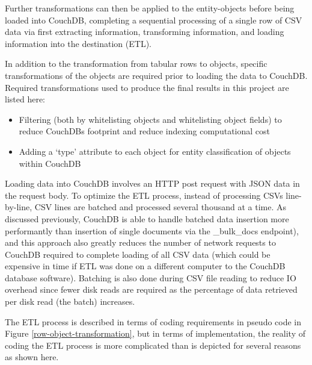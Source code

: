 Further transformations can then be applied to the entity-objects before being loaded into CouchDB, completing a sequential processing of a single row of CSV data via first extracting information, transforming information, and loading information into the destination (ETL).

In addition to the transformation from tabular rows to objects, specific transformations of the objects are required prior to loading the data to CouchDB. Required transformations used to produce the final results in this project are listed here:

\begin{itemize}
    \item Filtering (both by whitelisting objects and whitelisting object fields) to reduce CouchDBs footprint and reduce indexing computational cost
    \item Adding a `type' attribute to each object for entity classification of objects within CouchDB
\end{itemize}

Loading data into CouchDB involves an HTTP post request with JSON data in the request body. To optimize the ETL process, instead of processing CSVs line-by-line, CSV lines are batched and processed several thousand at a time. As discussed previously, CouchDB is able to handle batched data insertion more performantly than insertion of single documents via the \_bulk\_docs endpoint), and this approach also greatly reduces the number of network requests to CouchDB required to complete loading of all CSV data (which could be expensive in time if ETL was done on a different computer to the CouchDB database software). Batching is also done during CSV file reading to reduce IO overhead since fewer disk reads are required as the percentage of data retrieved per disk read (the batch) increases.

The ETL process is described in terms of coding requirements in pseudo code in Figure \ref{row-object-transformation}, but in terms of implementation, the reality of coding the ETL process is more complicated than is depicted for several reasons as shown here.

